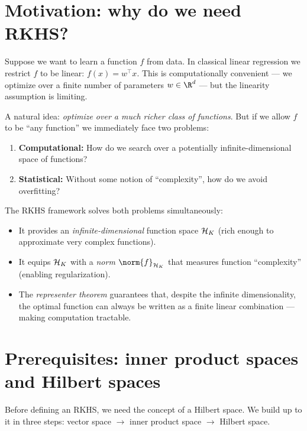\begin{notechapter}
\section{Motivation: why do we need RKHS?}
\label{rkhs:sec:motivation}

Suppose we want to learn a function $f$ from data. In classical linear
regression we restrict $f$ to be linear: $f(x) = w^\top x$. This is
computationally convenient --- we optimize over a finite number of
parameters $w \in \R^d$ --- but the linearity assumption is limiting.

A natural idea: \emph{optimize over a much richer class of functions}.
But if we allow $f$ to be ``any function'' we immediately face two
problems:

\begin{enumerate}[label=\emph{(\arabic*)}]
  \item \textbf{Computational:} How do we search over a potentially
  infinite-dimensional space of functions?
  \item \textbf{Statistical:} Without some notion of ``complexity'', how
  do we avoid overfitting?
\end{enumerate}

The RKHS framework solves both problems simultaneously:
\begin{itemize}
  \item It provides an \emph{infinite-dimensional} function space
  $\mathcal{H}_K$ (rich enough to approximate very complex functions).
  \item It equips $\mathcal{H}_K$ with a \emph{norm} $\norm{f}_{\hk}$ that
  measures function ``complexity'' (enabling regularization).
  \item The \emph{representer theorem} guarantees that, despite the
  infinite dimensionality, the optimal function can always be written as
  a finite linear combination --- making computation tractable.
\end{itemize}




\section{Prerequisites: inner product spaces and Hilbert spaces}
\label{rkhs:sec:prereq}

Before defining an RKHS, we need the concept of a Hilbert space. We
build up to it in three steps: vector space $\to$ inner product space
$\to$ Hilbert space.


\end{notechapter}
